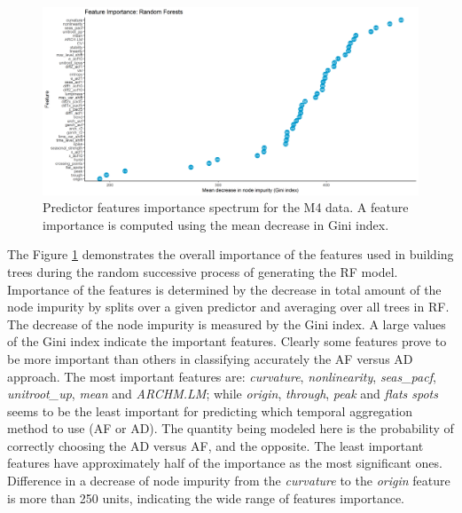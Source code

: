 \documentclass[]{elsarticle} %
\begin{document}
\begin{figure}[H]

{\centering \includegraphics[width=0.95\linewidth]{img/300dpi/Fig_importance} 

}

\caption{Predictor features importance spectrum for the M4 data. A feature importance is computed using the mean decrease in Gini index.}\label{fig:RFpartial}
\end{figure}

The Figure \ref{fig:RFpartial} demonstrates the overall importance of
the features used in building trees during the random successive process
of generating the RF model. Importance of the features is determined by
the decrease in total amount of the node impurity by splits over a given
predictor and averaging over all trees in RF. The decrease of the node
impurity is measured by the Gini index. A large values of the Gini index
indicate the important features. Clearly some features prove to be more
important than others in classifying accurately the AF versus AD
approach. The most important features are: \emph{curvature},
\emph{nonlinearity}, \emph{seas\_pacf}, \emph{unitroot\_up}, \emph{mean}
and \emph{ARCHM.LM}; while \emph{origin}, \emph{through}, \emph{peak}
and \emph{flats spots} seems to be the least important for predicting
which temporal aggregation method to use (AF or AD). The quantity being
modeled here is the probability of correctly choosing the AD versus AF,
and the opposite. The least important features have approximately half
of the importance as the most significant ones. Difference in a decrease
of node impurity from the \emph{curvature} to the \emph{origin} feature
is more than 250 units, indicating the wide range of features
importance.
\end{document}
